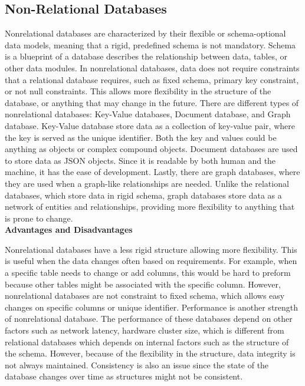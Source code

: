 \subsection[Non-Relational Databases]{Non-Relational Databases}
Nonrelational databases are characterized by their flexible or schema-optional data models, meaning that a rigid, predefined schema is not mandatory.
Schema is a blueprint of a database describes the relationship between data, tables, or other data modules.
In nonrelational databases, data does not require constraints that a relational database requires, such as fixed schema, primary key constraint, or not null constraints. 
This allows more flexibility in the structure of the database, or anything that may change in the future. 
There are different types of nonrelational databases: Key-Value databases, Document database, and Graph database. 
Key-Value database store data as a collection of key-value pair, where the key is served as the unique identifier. 
Both the key and values could be anything as objects or complex compound objects. Document databases are used to store data as JSON objects. 
Since it is readable by both human and the machine, it has the ease of development. Lastly, there are graph databases, 
where they are used when a graph-like relationships are needed. Unlike the relational databases, which store data in rigid schema, 
graph databases store data as a network of entities and relationships, providing more flexibility to anything that is prone to change. \\

\noindent \textbf{Advantages and Disadvantages}

Nonrelational databases have a less rigid structure allowing more flexibility.
This is useful when the data changes often based on requirements. For example, when a specific table needs to change or add columns, 
this would be hard to preform because other tables might be associated with the specific column. 
However, nonrelational databases are not constraint to fixed schema, which allows easy changes on specific columns or unique identifier.
Performance is another strength of nonrelational database. 
The performance of these databases depend on other factors such as network latency, hardware cluster size,
which is different from relational databases which depends on internal factors such as the structure of the schema. 
However, because of the flexibility in the structure, data integrity is not always maintained. 
Consistency is also an issue since the state of the database changes over time as structures might not be consistent.



